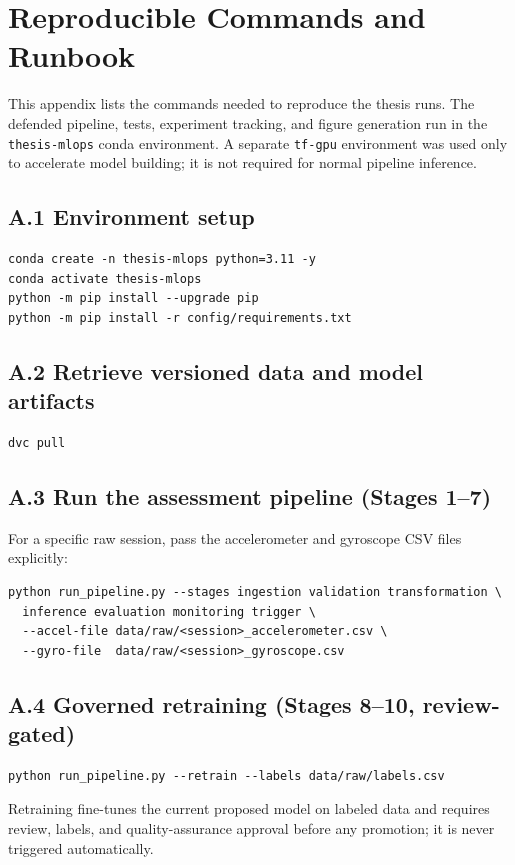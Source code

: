 \chapter{Reproducible Commands and Runbook}
\label{app:commands}

This appendix lists the commands needed to reproduce the thesis runs. The defended pipeline, tests, experiment tracking, and figure generation run in the \texttt{thesis-mlops} conda environment. A separate \texttt{tf-gpu} environment was used only to accelerate model building; it is not required for normal pipeline inference.

\section*{A.1 Environment setup}
\begin{footnotesize}
\begin{verbatim}
conda create -n thesis-mlops python=3.11 -y
conda activate thesis-mlops
python -m pip install --upgrade pip
python -m pip install -r config/requirements.txt
\end{verbatim}
\end{footnotesize}

\section*{A.2 Retrieve versioned data and model artifacts}
\begin{footnotesize}
\begin{verbatim}
dvc pull
\end{verbatim}
\end{footnotesize}

\section*{A.3 Run the assessment pipeline (Stages 1--7)}
For a specific raw session, pass the accelerometer and gyroscope CSV files explicitly:
\begin{footnotesize}
\begin{verbatim}
python run_pipeline.py --stages ingestion validation transformation \
  inference evaluation monitoring trigger \
  --accel-file data/raw/<session>_accelerometer.csv \
  --gyro-file  data/raw/<session>_gyroscope.csv
\end{verbatim}
\end{footnotesize}

\section*{A.4 Governed retraining (Stages 8--10, review-gated)}
\begin{footnotesize}
\begin{verbatim}
python run_pipeline.py --retrain --labels data/raw/labels.csv
\end{verbatim}
\end{footnotesize}
Retraining fine-tunes the current proposed model on labeled data and requires review, labels, and quality-assurance approval before any promotion; it is never triggered automatically.

